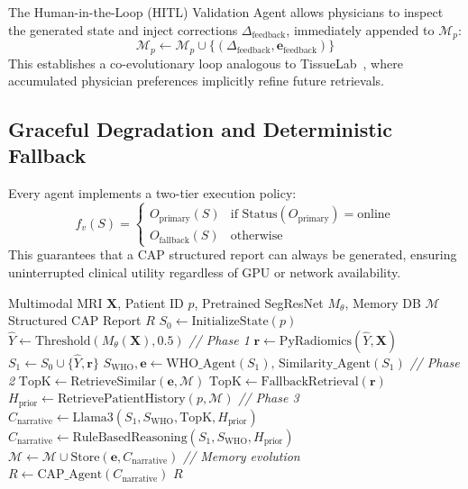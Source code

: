 \documentclass[journal]{IEEEtran}
\begin{document}
The Human-in-the-Loop (HITL) Validation Agent allows physicians to inspect
the generated state and inject corrections $\Delta_\text{feedback}$,
immediately appended to $\mathcal{M}_p$:
\begin{equation}
  \mathcal{M}_p \leftarrow \mathcal{M}_p \cup
  \{(\Delta_\text{feedback}, \mathbf{e}_\text{feedback})\}
\end{equation}
This establishes a co-evolutionary loop analogous to TissueLab~\cite{tissulab2025},
where accumulated physician preferences implicitly refine future retrievals.

\subsection{Graceful Degradation and Deterministic Fallback}

Every agent implements a two-tier execution policy:
\begin{equation}
  f_v(S) =
  \begin{cases}
    O_\text{primary}(S) & \text{if } \text{Status}(O_\text{primary}) = \text{online} \\
    O_\text{fallback}(S) & \text{otherwise}
  \end{cases}
\end{equation}
This guarantees that a CAP structured report can always be generated,
ensuring uninterrupted clinical utility regardless of GPU or network
availability.

\begin{algorithm}
\caption{Agentic Execution Pipeline with Fallback Routing}
\begin{algorithmic}[1]
\REQUIRE Multimodal MRI $\mathbf{X}$, Patient ID $p$,
         Pretrained SegResNet $M_\theta$, Memory DB $\mathcal{M}$
\ENSURE Structured CAP Report $R$
\STATE $S_0 \leftarrow \text{InitializeState}(p)$
\STATE $\hat{Y} \leftarrow \text{Threshold}(M_\theta(\mathbf{X}), 0.5)$
  \hfill \textit{// Phase 1}
\STATE $\mathbf{r} \leftarrow \text{PyRadiomics}(\hat{Y}, \mathbf{X})$
\STATE $S_1 \leftarrow S_0 \cup \{\hat{Y}, \mathbf{r}\}$
\STATE $S_\text{WHO}, \mathbf{e} \leftarrow \text{WHO\_Agent}(S_1),\,
  \text{Similarity\_Agent}(S_1)$ \hfill \textit{// Phase 2}
  \STATE $\text{TopK} \leftarrow \text{RetrieveSimilar}(\mathbf{e}, \mathcal{M})$
\ELSE
  \STATE $\text{TopK} \leftarrow \text{FallbackRetrieval}(\mathbf{r})$
\ENDIF
\STATE $H_\text{prior} \leftarrow \text{RetrievePatientHistory}(p, \mathcal{M})$
  \hfill \textit{// Phase 3}
  \STATE $C_\text{narrative} \leftarrow
    \text{Llama3}(S_1, S_\text{WHO}, \text{TopK}, H_\text{prior})$
\ELSE
  \STATE $C_\text{narrative} \leftarrow
    \text{RuleBasedReasoning}(S_1, S_\text{WHO}, H_\text{prior})$
\ENDIF
\STATE $\mathcal{M} \leftarrow \mathcal{M} \cup \text{Store}(\mathbf{e},
  C_\text{narrative})$ \hfill \textit{// Memory evolution}
\STATE $R \leftarrow \text{CAP\_Agent}(C_\text{narrative})$
\RETURN $R$
\end{algorithmic}
\end{algorithm}
\end{document}

